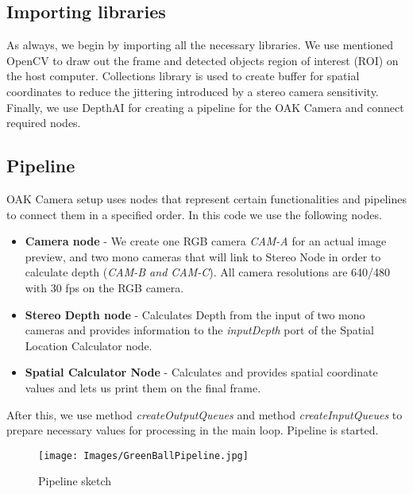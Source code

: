 \documentclass{article}
\begin{document}
\subsection{Importing libraries}As always, we begin by importing all the necessary libraries. We use mentioned OpenCV to draw out the frame and detected objects region of interest (ROI) on the host computer. Collections library is used to create buffer for spatial coordinates to reduce the jittering introduced by a stereo camera sensitivity. Finally, we use DepthAI for creating a pipeline for the OAK Camera and connect required nodes. \subsection{Pipeline}
OAK Camera setup uses nodes that represent certain functionalities and pipelines to connect them in a specified order. In this code we use the following nodes.

\begin{itemize}
    \item \textbf{Camera node} - We create one RGB camera \textit{CAM-A} for an actual image preview, and two mono cameras that will link to Stereo Node in order to calculate depth (\textit{CAM-B and CAM-C}). All camera resolutions are 640/480 with 30 fps on the RGB camera.  

    \item \textbf{Stereo Depth node} - Calculates Depth from the input of two mono cameras and provides information to the \textit{inputDepth} port of the Spatial Location Calculator node.
    
    \item \textbf{Spatial Calculator Node} - Calculates and provides spatial coordinate values and lets us print them on the final frame.
\end{itemize}

After this, we use method \textit{createOutputQueues} and method \textit{createInputQueues} to prepare necessary values for processing in the main loop. Pipeline is started.

\begin{figure}[H]
    \centering
    \texttt{[image: Images/GreenBallPipeline.jpg]}
    \caption{Pipeline sketch}
    \label{fig:enter-label}
\end{figure}

\newpage
\end{document}

